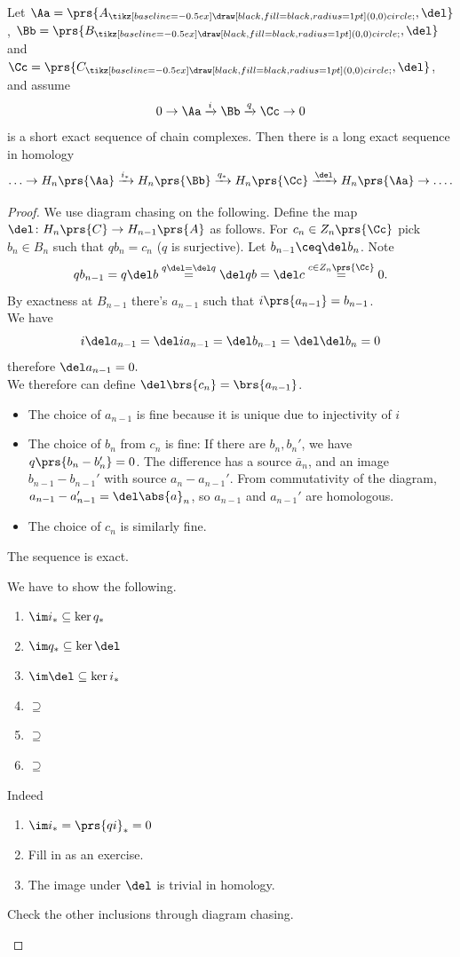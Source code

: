 \documentclass[10pt,a4paper,twoside,openany,hidelinks]{book}
\newcommand{\tikzcircle}[2][red,fill=red]{\tikz[baseline=-0.5ex]\draw[#1,radius=#2] (0,0) circle ;}%
\begin{document}
\begin{lemma}
Let $\Aa = \prs{A_{\tikzcircle[black, fill=black]{1pt}}, \del}$, $\Bb = \prs{B_{\tikzcircle[black, fill=black]{1pt}}, \del}$ and $\Cc = \prs{C_{\tikzcircle[black, fill=black]{1pt}}, \del}$, and assume
\[0 \to \Aa \xrightarrow{i} \Bb \xrightarrow{q} \Cc \to 0\]
is a short exact sequence of chain complexes. Then there is a long exact sequence in homology
\[\ldots \to H_n\prs{\Aa} \xrightarrow{i_*} H_n\prs{\Bb} \xrightarrow{q_*} H_n\prs{\Cc} \xrightarrow{\del} H_n\prs{\Aa} \to \ldots \text{.}\]
\end{lemma}
\begin{proof}
We use diagram chasing on the following.
Define the map $\del \colon H_n\prs{C} \to H_{n-1} \prs{A}$ as follows.
For $c_n \in Z_n\prs{\Cc}$ pick $b_n \in B_n$ such that $q b_n = c_n$ ($q$ is surjective). Let $b_{n-1} \ceq \del b_n$. Note \[q b_{n-1} = q\del b \stackrel{q\del = \del q}{=} \del qb = \del c \stackrel{c \in Z_n\prs{\Cc}}{=} 0\text{.}\]
By exactness at $B_{n-1}$ there's $a_{n-1}$ such that $i\prs{a_{n-1}} = b_{n-1}$. \\
We have
\[i \del a_{n-1} = \del i a_{n-1} = \del b_{n-1} = \del \del b_n = 0\]
therefore $\del a_{n-1} = 0\text{.}$\\
We therefore can define $\del \brs{c_n} = \brs{a_{n-1}}$.
\begin{itemize}
\item
The choice of $a_{n-1}$ is fine because it is unique due to injectivity of $i$ %
\item The choice of $b_n$ from $c_n$ is fine: If there are $b_n, b_n'$, we have $q\prs{b_n - b_n'} = 0$. The difference has a source $\bar{a}_n$, and an image $b_{n-1} - b_{n-1}'$ with source $a_n - a_{n-1}'$. From commutativity of the diagram, $a_{n-1} - a_{n-1}' = \del \abs{a}_n$, so $a_{n-1}$ and $a_{n-1}'$ are homologous. %
\item The choice of $c_n$ is similarly fine. %
\end{itemize}
\begin{claim}
The sequence is exact.
\end{claim}
We have to show the following.
\begin{enumerate}
\item $\im i_* \subseteq \ker q_*$
\item $\im q_* \subseteq \ker \del$
\item $\im \del \subseteq \ker i_*$
\item $\supseteq$
\item $\supseteq$
\item $\supseteq$
\end{enumerate}
Indeed
\begin{enumerate}
\item $\im i_* = \prs{q i}_* = 0$
\item Fill in as an exercise.
\item The image under $\del$ is trivial in homology.
\end{enumerate}
\begin{exercise}
Check the other inclusions through diagram chasing.
\end{exercise}
\end{proof}
\end{document}
